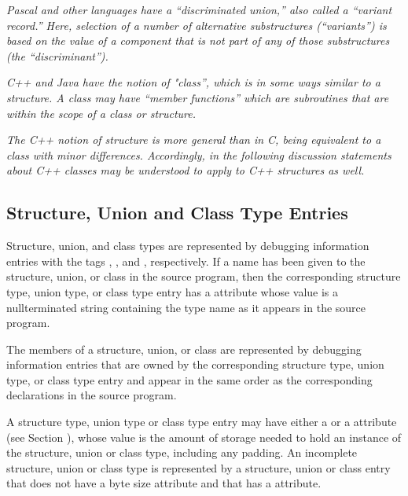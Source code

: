 \textit{Pascal and other languages have a “discriminated union,”
also called a “variant record.” Here, selection of a
number of alternative substructures (“variants”) is based
on the value of a component that is not part of any of those
substructures (the “discriminant”).}

\textit{C++ and Java have the notion of "class”, which is in some
ways similar to a structure. A class may have “member
functions” which are subroutines that are within the scope
of a class or structure.}

\textit{The C++ notion of structure is more general than in C, being
equivalent to a class with minor differences. Accordingly,
in the following discussion statements about C++ classes may
be understood to apply to C++ structures as well.}

\subsection{Structure, Union and Class Type Entries}
\label{chap:structureunionandclasstypeentries}


Structure, union, and class types are represented by debugging
information entries with 
the tags ,
, 
and ,
respectively. If a name has been given to the structure,
union, or class in the source program, then the corresponding
structure type, union type, or class type entry has a
 attribute whose value is a null\dash terminated string
containing the type name as it appears in the source program.

The members of a structure, union, or class are represented
by debugging information entries that are owned by the
corresponding structure type, union type, or class type entry
and appear in the same order as the corresponding declarations
in the source program.

A structure type, union type or class type entry may have
either a  or a  attribute 
(see Section ), 
whose value is the amount of storage needed
to hold an instance of the structure, union or class type,
including any padding.  An incomplete structure, union or
class type is represented by a structure, union or class
entry that does not have a byte size attribute and that has
a  attribute.

